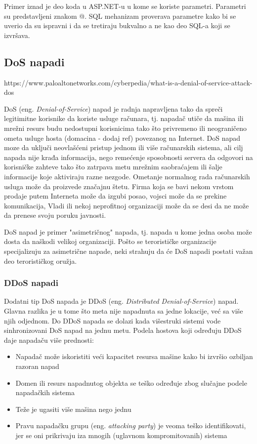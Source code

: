 \documentclass[a4paper]{article}
\begin{document}
{\noindent Primer iznad je deo koda u ASP.NET-u u kome se koriste parametri. Parametri su predstavljeni znakom @. SQL mehanizam proverava parametre kako bi se uverio da su ispravni i da se tretiraju bukvalno a ne kao deo SQL-a koji se izvršava.


\subsection{DoS napadi}
\label{subsec:DoS}

https://www.paloaltonetworks.com/cyberpedia/what-is-a-denial-of-service-attack-dos

DoS (eng. {\em Denial-of-Service}) napad je radnja napravljena tako da spreči legitimitne korisnike da koriste usluge računara, tj. napadač utiče da mašina ili mrežni resurs  budu nedostupni korisnicima tako što privremeno ili neograničeno ometa usluge hosta (domacina - dodaj ref) povezanog na Internet. DoS napad moze da uključi neovlašćeni pristup jednom ili više računarskih sistema, ali cilj napada nije krađa informacija, nego remećenje sposobnosti servera da odgovori na korisničke zahteve tako što zatrpava metu mrežnim saobraćajem ili šalje informacije koje aktiviraju razne nezgode. Ometanje normalnog rada računarskih usluga može da proizvede značajnu štetu. Firma koja se bavi nekom vrstom prodaje putem Interneta može da izgubi posao, vojsci može da se prekine komunikacija, Vladi ili nekoj neprofitnoj organizaciji može da se desi da ne može da prenese svoju poruku javnosti.

DoS napad je primer "asimetričnog" napada, tj. napada u kome jedna osoba može dosta da naškodi velikoj organizaciji. Pošto se terorističke organizacije specijalizuju za asimetrične napade, neki strahuju da će DoS napadi postati važan deo terorističkog oružja.

\subsubsection{DDoS napadi}
\label{subsubsec:DDoS}

Dodatni tip DoS napada je DDoS (eng. {\em Distributed Denial-of-Service}) napad. Glavna razlika je u tome što meta nije napadnuta sa jedne lokacije, već sa više njih odjednom. Do DDoS napada se dolazi kada višestruki sistemi vode sinhronizovani DoS napad na jednu metu. Podela hostova koji određuju DDoS daje napadaču više prednosti:
\begin{itemize}
\item Napadač može iskoristiti veći kapacitet resursa mašine kako bi izvršio ozbiljan razoran napad
\item Domen ili resurs napadnutog objekta se teško određuje zbog slučajne podele napadačkih sistema
\item Teže je ugasiti više mašina nego jednu
\item Pravu napadačku grupu (eng. {\em attacking party}) je veoma teško identifikovati, jer se oni prikrivaju iza mnogih (uglavnom kompromitovanih) sistema
\end{itemize}

}
\end{document}
